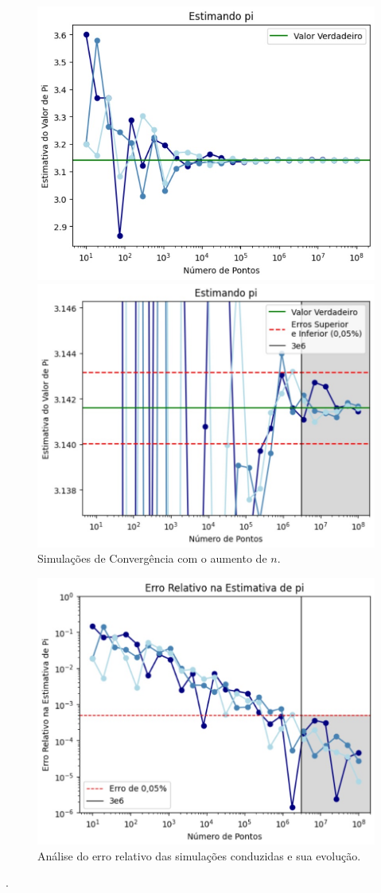 \documentclass{article}
\begin{document}
\begin{figure}[h]
    \begin{minipage}[!]{0.5\linewidth}
    \includegraphics[width=1\linewidth]{Figura 3-1.jpg}
    \end{minipage}
    \begin{minipage}[!]{0.5\linewidth}
    \includegraphics[width=1\linewidth]{Figura 3-2.jpg}
    \end{minipage}
    \caption{\label{fig:Figura 3}Simulações de Convergência com o aumento de $n$.}
\end{figure}

\begin{figure}[h]
\centering
\includegraphics[width=0.60\linewidth]{Figura 4.jpg}
\caption{\label{fig:Figura 4}Análise do erro relativo das simulações conduzidas e sua evolução.}
\end{figure}.
\end{document}
